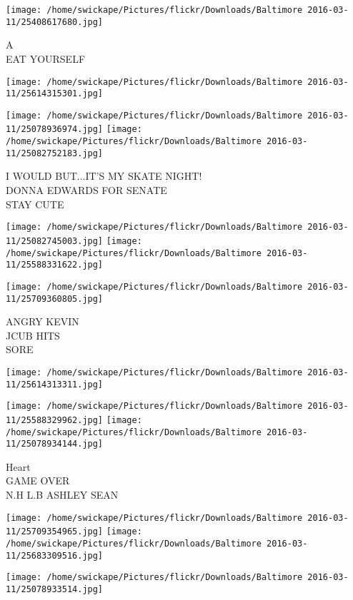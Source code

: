 \documentclass[10pt,letterpaper]{article}
\begin{document}
\vspace{0.25in}
\texttt{[image: /home/swickape/Pictures/flickr/Downloads/Baltimore 2016-03-11/25408617680.jpg]}

A\\
EAT YOURSELF
\pagebreak

\texttt{[image: /home/swickape/Pictures/flickr/Downloads/Baltimore 2016-03-11/25614315301.jpg]}

\vspace{0.25in}
\texttt{[image: /home/swickape/Pictures/flickr/Downloads/Baltimore 2016-03-11/25078936974.jpg]}
\texttt{[image: /home/swickape/Pictures/flickr/Downloads/Baltimore 2016-03-11/25082752183.jpg]}

I WOULD BUT...IT'S MY SKATE NIGHT!\\
DONNA EDWARDS FOR SENATE\\
STAY CUTE
\pagebreak

\texttt{[image: /home/swickape/Pictures/flickr/Downloads/Baltimore 2016-03-11/25082745003.jpg]}
\texttt{[image: /home/swickape/Pictures/flickr/Downloads/Baltimore 2016-03-11/25588331622.jpg]}

\texttt{[image: /home/swickape/Pictures/flickr/Downloads/Baltimore 2016-03-11/25709360805.jpg]}

ANGRY KEVIN\\
JCUB HITS\\
SORE
\pagebreak

\texttt{[image: /home/swickape/Pictures/flickr/Downloads/Baltimore 2016-03-11/25614313311.jpg]}

\vspace{0.25in}
\texttt{[image: /home/swickape/Pictures/flickr/Downloads/Baltimore 2016-03-11/25588329962.jpg]}
\texttt{[image: /home/swickape/Pictures/flickr/Downloads/Baltimore 2016-03-11/25078934144.jpg]}

Heart\\
GAME OVER\\
N.H L.B ASHLEY SEAN
\pagebreak

\texttt{[image: /home/swickape/Pictures/flickr/Downloads/Baltimore 2016-03-11/25709354965.jpg]}
\texttt{[image: /home/swickape/Pictures/flickr/Downloads/Baltimore 2016-03-11/25683309516.jpg]}

\vspace{0.25in}
\texttt{[image: /home/swickape/Pictures/flickr/Downloads/Baltimore 2016-03-11/25078933514.jpg]}
\end{document}
